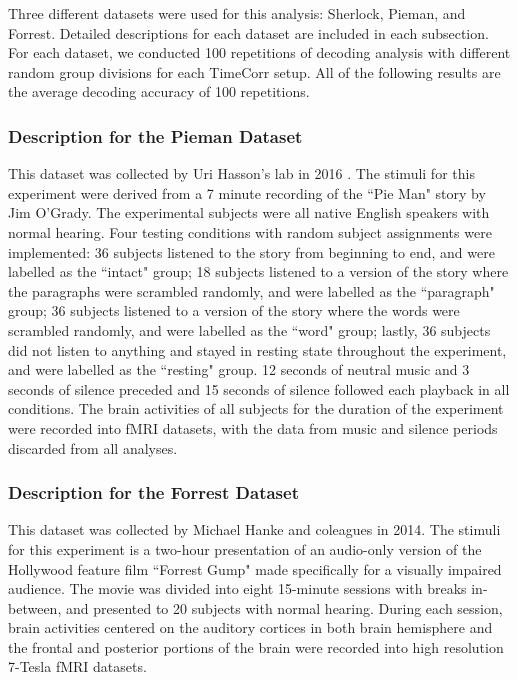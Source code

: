 \documentclass[11pt]{article}
\begin{document}
Three different datasets were used for this analysis: Sherlock, Pieman, and Forrest. Detailed descriptions for each dataset are included in each subsection. For each dataset, we conducted 100 repetitions of decoding analysis with different random group divisions for each TimeCorr setup. All of the following results are the average decoding accuracy of 100 repetitions.

\subsubsection{Description for the Pieman Dataset}
This dataset was collected by Uri Hasson's lab in 2016 \citep{hasson2016}. The stimuli for this experiment were derived from a 7 minute recording of the ``Pie Man" story by Jim O'Grady. The experimental subjects were all native English speakers with normal hearing. Four testing conditions with random subject assignments were implemented: 36 subjects listened to the story from beginning to end, and were labelled as the ``intact" group; 18 subjects listened to a version of the story where the paragraphs were scrambled randomly, and were labelled as the ``paragraph" group; 36 subjects listened to a version of the story where the words were scrambled randomly, and were labelled as the ``word" group; lastly, 36 subjects did not listen to anything and stayed in resting state throughout the experiment, and were labelled as the ``resting" group. 12 seconds of neutral music and 3 seconds of silence preceded and 15 seconds of silence followed each playback in all conditions. The brain activities of all subjects for the duration of the experiment were recorded into fMRI datasets, with the data from music and silence periods discarded from all analyses.

\subsubsection{Description for the Forrest Dataset}
This dataset was collected by Michael Hanke and coleagues in 2014\citep{Hanke2014}. The stimuli for this experiment is a two-hour presentation of an audio-only version of the Hollywood feature film ``Forrest Gump" made specifically for a visually impaired audience. The movie was divided into eight 15-minute sessions with breaks in-between, and presented to 20 subjects with normal hearing. During each session, brain activities centered on the auditory cortices in both brain hemisphere and the frontal and posterior portions of the brain were recorded into high resolution 7-Tesla fMRI datasets.
\end{document}
